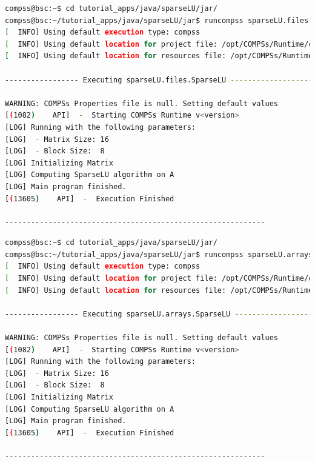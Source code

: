 \begin{lstlisting}[language=bash]
compss@bsc:~$ cd tutorial_apps/java/sparseLU/jar/
compss@bsc:~/tutorial_apps/java/sparseLU/jar$ runcompss sparseLU.files.SparseLU 4 8
[  INFO] Using default execution type: compss
[  INFO] Using default location for project file: /opt/COMPSs/Runtime/configuration/xml/projects/default_project.xml
[  INFO] Using default location for resources file: /opt/COMPSs/Runtime/configuration/xml/resources/default_resources.xml

----------------- Executing sparseLU.files.SparseLU --------------------------

WARNING: COMPSs Properties file is null. Setting default values
[(1082)    API]  -  Starting COMPSs Runtime v<version>
[LOG] Running with the following parameters:
[LOG]  - Matrix Size: 16
[LOG]  - Block Size:  8
[LOG] Initializing Matrix
[LOG] Computing SparseLU algorithm on A
[LOG] Main program finished.
[(13605)    API]  -  Execution Finished

------------------------------------------------------------

\end{lstlisting}

\begin{lstlisting}[language=bash]
compss@bsc:~$ cd tutorial_apps/java/sparseLU/jar/
compss@bsc:~/tutorial_apps/java/sparseLU/jar$ runcompss sparseLU.arrays.SparseLU 8 8
[  INFO] Using default execution type: compss
[  INFO] Using default location for project file: /opt/COMPSs/Runtime/configuration/xml/projects/default_project.xml
[  INFO] Using default location for resources file: /opt/COMPSs/Runtime/configuration/xml/resources/default_resources.xml

----------------- Executing sparseLU.arrays.SparseLU --------------------------

WARNING: COMPSs Properties file is null. Setting default values
[(1082)    API]  -  Starting COMPSs Runtime v<version>
[LOG] Running with the following parameters:
[LOG]  - Matrix Size: 16
[LOG]  - Block Size:  8
[LOG] Initializing Matrix
[LOG] Computing SparseLU algorithm on A
[LOG] Main program finished.
[(13605)    API]  -  Execution Finished

------------------------------------------------------------

\end{lstlisting}




